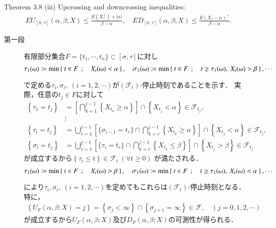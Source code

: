 	\begin{itembox}[l]{Theorem 3.8 (iii)}
		Upcrossing and downcrossing inequalities:
		\begin{align}
			E U_{[\sigma,\tau]}(\alpha,\beta;X) \leq \frac{E(X_\tau^+) + |\alpha|}{\beta-\alpha},
			\quad E D_{[\sigma,\tau]}(\alpha,\beta;X) \leq \frac{E(X_\tau-\alpha)^+}{\beta-\alpha}.
		\end{align}
	\end{itembox}
	
	\begin{prf}\mbox{}
		\begin{description}
			\item[第一段]
				有限部分集合$F = \{t_1,\cdots,t_n\} \subset [\sigma,\tau]$に対し
				\begin{align}
					\tau_1(\omega) \coloneqq \operatorname*{min}_{} \left\{\ t \in F\ \, ; \quad X_t(\omega) < \alpha\ \right\},
					\quad \sigma_1(\omega) \coloneqq \operatorname*{min}_{} \left\{\ t \in F\ \, ; \quad t \geq \tau_1(\omega),\ X_t(\omega) > \beta\ \right\},
					\cdots
				\end{align}
				で定める$\tau_i,\sigma_i,\ (i=1,2,\cdots)$が$(\mathscr{F}_t)$-停止時刻であることを示す．
				実際，任意の$t_j \in F$に対して
				\begin{align}
					\left\{\tau_1 = t_j\right\} &= \left[\bigcap_{k=1}^{j-1} \left\{ X_{t_k} \geq \alpha \right\}\right] \cap \left\{ X_{t_j} < \alpha \right\} \in \mathscr{F}_{t_j}, \\
					&\vdots \\
					\left\{\tau_i = t_j\right\} &= \bigcup_{r=1}^{j-1} \left[ \{\sigma_{i-1} = t_r\} \cap \bigcap_{k=r}^{j-1} \left\{ X_{t_k} \geq \alpha \right\}\right] \cap \left\{ X_{t_j} < \alpha \right\}   \in \mathscr{F}_{t_j}, \\
					\left\{\sigma_i = t_j\right\} &= \bigcup_{r=1}^{j-1} \left[ \{\tau_i = t_r\} \cap \bigcap_{k=r}^{j-1} \left\{ X_{t_k} \leq \beta \right\}\right] \cap \left\{ X_{t_j} > \beta \right\}   \in \mathscr{F}_{t_j}
				\end{align}
				が成立するから$\left\{ \tau_i \leq t \right\} \in \mathscr{F}_t\ (\forall t \geq 0)$
				が満たされる．
				\begin{align}
					\tau_1(\omega) \coloneqq \operatorname*{min}_{} \left\{\ t \in F\ \, ; \quad X_t(\omega) > \beta\ \right\},
					\quad \sigma_1(\omega) \coloneqq \operatorname*{min}_{} \left\{\ t \in F\ \, ; \quad t \geq \tau_1(\omega),\ X_t(\omega) < \alpha\ \right\},
					\cdots
				\end{align}
				により$\tau_i,\sigma_i,\ (i=1,2,\cdots)$を定めてもこれらは$(\mathscr{F}_t)$-停止時刻となる．
				特に，
				\begin{align}
					\left\{ U_F(\alpha,\beta;X) = j \right\}
					= \left\{ \sigma_j < \infty \right\} \cap \left\{ \sigma_{j+1} = \infty \right\}
					\in \mathscr{F},
					\quad (j=0,1,2,\cdots)
				\end{align}
				が成立するから$U_F(\alpha,\beta;X)$及び$D_F(\alpha,\beta;X)$の可測性が得られる．
				

\end{description}
\end{prf}

